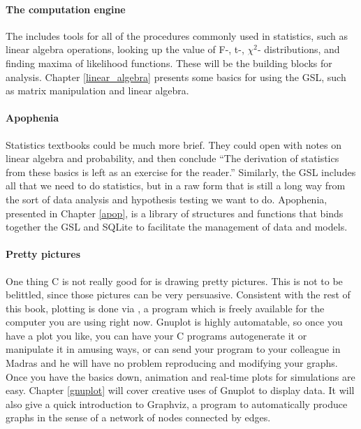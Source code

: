 \paragraph{The computation engine} The 
includes tools for all of the procedures commonly used in statistics,
such as linear algebra operations, looking up the value of F-, t-, $\chi^2$-
distributions, and finding maxima of likelihood functions. These
will be the building blocks for analysis. Chapter \ref{linear_algebra}
presents some basics for using the GSL, such as matrix manipulation and
linear algebra.

\paragraph{Apophenia}
Statistics textbooks could be much more brief. They could open
with notes on linear algebra and probability, and then conclude ``The
derivation of statistics from these basics is left as an exercise for
the reader.'' Similarly, the GSL includes all that we need to do
statistics, but in a raw form that is still a long way from the
sort of data analysis and hypothesis testing we want to do. Apophenia,
presented in Chapter \ref{apop}, is a library of structures and functions
that binds together the GSL and SQLite to facilitate the management of
data and models.

\paragraph{Pretty pictures} One thing C is not really good for is drawing
pretty pictures. This is not to be belittled, since those pictures
can be very persuasive. Consistent with the rest of this book, plotting
is done via , a program which is freely available for
the computer you are using right now. Gnuplot is highly automatable, so once
you have a plot you like, you can have your C programs autogenerate
it or manipulate it in amusing ways, or can send your program to your
colleague in Madras and he will have no problem reproducing and modifying
your graphs. Once you have the basics down, animation and real-time
plots for simulations are easy. Chapter \ref{gnuplot} will cover creative uses of
Gnuplot to display data. It will also give a quick introduction to
Graphviz, a program to automatically produce graphs in the sense of a network of nodes
connected by edges.






